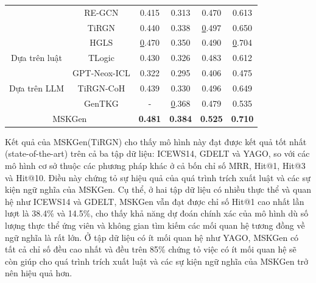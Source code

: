 \begin{table}[H]
\begin{adjustbox}{width=\textwidth}
\begin{tabular}{|cc|cccc|}
\multicolumn{1}{|c|}{}                                 & RE-GCN                   & 0.415                    & 0.313                      & 0.470                      & 0.613          \\ \cline{2-2}
\multicolumn{1}{|c|}{}                                 & TiRGN                    & 0.440                    & 0.338                      & {\ul 0.497}                & 0.650          \\ \cline{2-2}
\multicolumn{1}{|c|}{}                                 & HGLS                     & {\ul 0.470}              & 0.350                      & 0.490                      & {\ul 0.704}    \\ \hline
\multicolumn{1}{|c|}{Dựa trên luật}                    & TLogic                   & 0.430                    & 0.326                      & 0.483                      & 0.612          \\ \hline
\multicolumn{1}{|c|}{\multirow{3}{*}{Dựa trên LLM}}    & GPT-Neox-ICL             & 0.322                    & 0.295                      & 0.406                      & 0.475          \\ \cline{2-2}
\multicolumn{1}{|c|}{}                                 & TiRGN-CoH                & 0.439                    & 0.330                      & 0.496                      & 0.649          \\ \cline{2-2}
\multicolumn{1}{|c|}{}                                 & GenTKG                   & -                        & {\ul 0.368}                & 0.479                      & 0.535          \\ \hline
\multicolumn{2}{|c|}{MSKGen}                                                      & \textbf{0.481}           & \textbf{0.384}             & \textbf{0.525}             & \textbf{0.710} \\ \hline
\end{tabular}
\end{adjustbox}  
\end{table}
\vspace{-5mm}

Kết quả của MSKGen(TiRGN) cho thấy mô hình này đạt được kết quả tốt nhất (state-of-the-art) trên cả ba tập dữ liệu: ICEWS14, GDELT và YAGO, so
với các mô hình cơ sở thuộc các phương pháp khác ở cả bốn chỉ số MRR, Hit@1, Hit@3 và Hit@10. Điều này chứng tỏ sự hiệu quả của quá trình 
trích xuất luật và các sự kiện ngữ nghĩa của MSKGen. Cụ thể, ở hai tập dữ liệu có nhiều thực thể và quan hệ như ICEWS14 và GDELT, MSKGen vẫn đạt
được chỉ số Hit@1 cao nhất lần lượt là 38.4\% và 14.5\%, cho thấy khả năng dự đoán chính xác của mô hình dù số lượng thực thể ứng viên và không gian tìm kiếm các mối quan hệ tương đồng về ngữ nghĩa là rất lớn.
Ở tập dữ liệu có ít mối quan hệ như YAGO, MSKGen có tất cả chỉ số đều cao nhất và đều trên 85\% chứng tỏ việc có ít mối quan hệ sẽ còn giúp cho quá trình trích xuất luật 
và các sự kiện ngữ nghĩa của MSKGen trở nên hiệu quả hơn.

